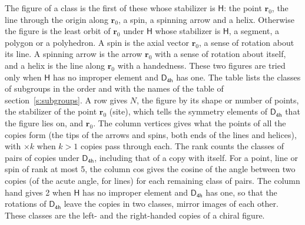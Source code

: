 \documentclass[10pt,a4paper]{article}
\numberwithin{equation}{section}
\newcommand{\grp}[1]{\mathsf{#1}}
\newcommand{\pointr}{\mathbf{r}}
\begin{document}
\leavevmode\label{n:head.figure}The figure of a class is the first of these whose stabilizer is $\grp{H}$: the point $\pointr_0$, the line through the origin along $\pointr_0$, a spin, a spinning arrow and a helix. Otherwise the figure is the least orbit of $\pointr_0$ under $\grp{H}$ whose stabilizer is $\grp{H}$, a segment, a polygon or a polyhedron. A spin is the axial vector $\pointr_0$, a sense of rotation about its line. A spinning arrow is the arrow $\pointr_0$ with a sense of rotation about itself, and a helix is the line along $\pointr_0$ with a handedness. These two figures are tried only when $\grp{H}$ has no improper element and $\grp{D_{4h}}$ has one. The table lists the classes of subgroups in the order and with the names of the table of section~\ref{s:subgroups}. \label{n:head.site}A row gives $N$, the figure by its shape or number of points, the stabilizer of the point $\pointr_0$ (site), which tells the symmetry elements of $\grp{D_{4h}}$ that the figure lies on, and $\pointr_0$. \label{n:head.vertices}The column vertices gives what the points of all the copies form (the tips of the arrows and spins, both ends of the lines and helices), with ${\times}k$ when $k > 1$ copies pass through each. \label{n:head.rank}The rank counts the classes of pairs of copies under $\grp{D_{4h}}$, including that of a copy with itself. \label{n:head.cos}For a point, line or spin of rank at most 5, the column cos gives the cosine of the angle between two copies (of the acute angle, for lines) for each remaining class of pairs. \label{n:head.hand}The column hand gives 2 when $\grp{H}$ has no improper element and $\grp{D_{4h}}$ has one, so that the rotations of $\grp{D_{4h}}$ leave the copies in two classes, mirror images of each other. These classes are the left- and the right-handed copies of a chiral figure.
\end{document}
